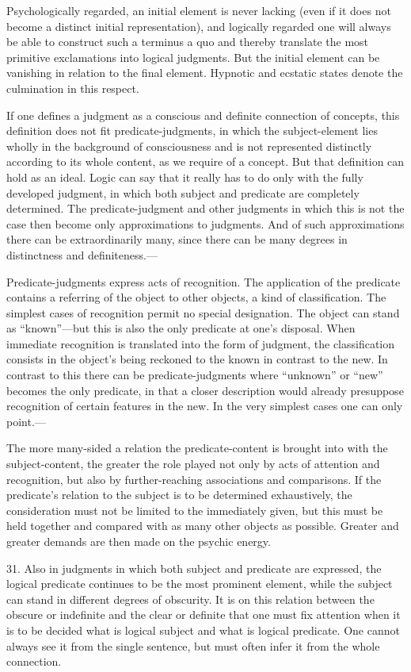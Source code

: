 \documentclass[12pt,a4paper]{book}
\newcommand{\opage}[1]{\marginnote{\footnotesize\textit{[#1]}}}
\begin{document}
Psychologically regarded, an initial element is never lacking (even if it
does not become a distinct initial representation), and logically regarded
one will always be able to construct such a terminus a quo and thereby
translate the most primitive exclamations into logical judgments. But the
initial element can be \opage{87}vanishing in relation to the final element.
Hypnotic and ecstatic states denote the culmination in this respect.

If one defines a judgment as a conscious and definite connection of
concepts, this definition does not fit predicate-judgments, in which the
subject-element lies wholly in the background of consciousness and is not
represented distinctly according to its whole content, as we require of a
concept. But that definition can hold as an ideal. Logic can say that it
really has to do only with the fully developed judgment, in which both
subject and predicate are completely determined. The predicate-judgment
and other judgments in which this is not the case then become only
approximations to judgments. And of such approximations there can be
extraordinarily many, since there can be many degrees in distinctness and
definiteness.---

Predicate-judgments express acts of recognition. The application of the
predicate contains a referring of the object to other objects, a kind of
classification. The simplest cases of recognition permit no special
designation. The object can stand as ``known''---but this is also the only
predicate at one's disposal. When immediate recognition is translated into
the form of judgment, the classification consists in the object's being
reckoned to the known in contrast to the new. In contrast to this there
can be predicate-judgments where ``unknown'' or ``new'' becomes the only
predicate, in that a closer description would already presuppose
recognition of certain features in the new. In the very simplest cases one
can only point.---

The more many-sided a relation the predicate-content is brought into with
the subject-content, the greater the role played not only by acts of
attention and recognition, but also by further-reaching associations and
comparisons. If the predicate's relation to the subject is to be
determined exhaustively, the consideration must not be limited to the
immediately given, but this must be held together and compared with as
many other objects as possible. Greater and greater demands are then made
on the psychic energy.

31. Also in judgments in which both subject and predicate \opage{88}are expressed,
the logical predicate continues to be the most prominent element, while
the subject can stand in different degrees of obscurity. It is on this
relation between the obscure or indefinite and the clear or definite that
one must fix attention when it is to be decided what is logical subject and
what is logical predicate. One cannot always see it from the single
sentence, but must often infer it from the whole connection.
\end{document}
